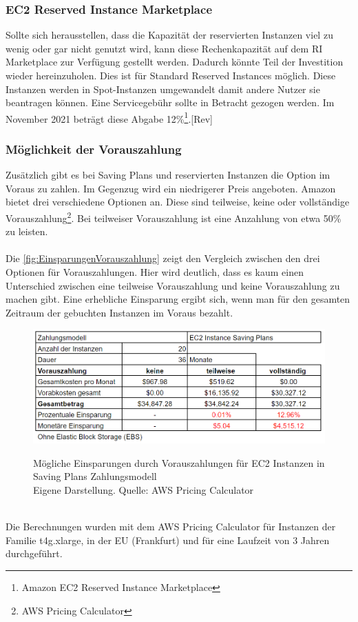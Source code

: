 \subsubsection*{EC2 Reserved Instance Marketplace}\label{sssec:RI-Marketplace}
Sollte sich herausstellen, dass die Kapazität der reservierten Instanzen viel zu wenig oder gar nicht genutzt wird, kann diese Rechenkapazität auf dem RI Marketplace zur Verfügung gestellt werden. Dadurch könnte Teil der Investition wieder hereinzuholen. Dies ist für Standard Reserved Instances möglich. Diese Instanzen werden in Spot-Instanzen umgewandelt damit andere Nutzer sie beantragen können. Eine Servicegebühr sollte in Betracht gezogen werden. Im November 2021 beträgt diese Abgabe 12\%\footnote{\cite{AMZ23}Amazon EC2 Reserved Instance Marketplace}.[Rev]

\subsubsection*{Möglichkeit der Vorauszahlung}\label{sssec:Vorauszahlung}
Zusätzlich gibt es bei Saving Plans und reservierten Instanzen die Option im Voraus zu zahlen. Im Gegenzug wird ein niedrigerer Preis angeboten. Amazon bietet drei verschiedene Optionen an. Diese sind teilweise, keine oder vollständige Vorauszahlung\footnote{\cite{AMZ17} AWS Pricing Calculator}. Bei teilweiser Vorauszahlung ist eine Anzahlung von etwa 50\% zu leisten.
\\\\
Die \autoref{fig:EinsparungenVorauszahlung} zeigt den Vergleich zwischen den drei Optionen für Vorauszahlungen. Hier wird deutlich, dass es kaum einen Unterschied zwischen eine teilweise Vorauszahlung und keine Vorauszahlung zu machen gibt. Eine erhebliche Einsparung ergibt sich, wenn man für den gesamten Zeitraum der gebuchten Instanzen im Voraus bezahlt.
\begin{figure}[h!]
    \centering
    \includegraphics[scale=0.6]{sources/EinsparungenVorauszahlung}\label{fig:EinsparungenVorauszahlung}\\
    \caption[Mögliche Einsparungen durch Vorauszahlungen]{}
    \label{fig:EinsparungenVorauszahlung}Mögliche Einsparungen durch Vorauszahlungen für EC2 Instanzen in Saving Plans Zahlungsmodell\\
    Eigene Darstellung. Quelle: {\cite{AMZ17}AWS Pricing Calculator}
  \end{figure}
  \\
Die Berechnungen wurden mit dem AWS Pricing Calculator {\cite{AMZ17}} für Instanzen der Familie t4g.xlarge, in der EU (Frankfurt) und für eine Laufzeit von 3 Jahren durchgeführt. 
